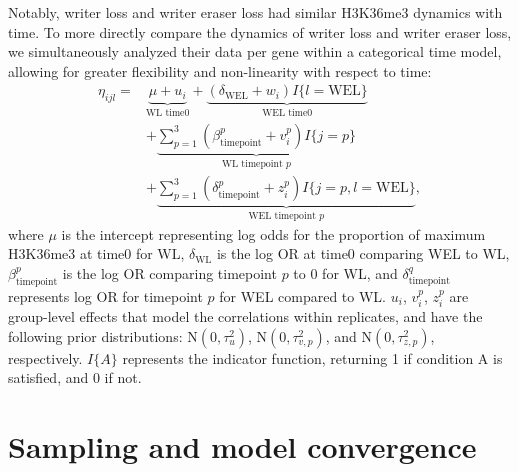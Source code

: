 \documentclass[12pt]{extarticle}
\begin{document}
Notably, writer loss and writer eraser loss had similar H3K36me3 dynamics with time. To more directly compare the dynamics of writer loss and writer eraser loss, we simultaneously analyzed their data per gene within a categorical time model, allowing for greater flexibility and non-linearity with respect to time:
\begin{align}
	\eta_{ijl} = &\underbrace{\mu + u_{i}}_{\text{WL time0}} + \underbrace{(\delta_{\text{WEL}} + w_{i})I\{l = \text{WEL}\}}_{\text{WEL time0}} \\ 
	&+ \underbrace{\sum_{p = 1}^{3}(\beta_{\text{timepoint}}^{p} + v_{i}^{p})I\{j = p\}}_{\text{WL timepoint }p} \nonumber \\ 
	&+ \underbrace{\sum_{p = 1}^{3}(\delta_{\text{timepoint}}^{p} + z_{i}^{p})I\{j = p, l = \text{WEL}\}}_{\text{WEL timepoint }p},\nonumber
\end{align}
where $\mu$ is the intercept representing log odds for the proportion of maximum H3K36me3 at time0 for WL, $\delta_{\text{WL}}$ is the log OR at time0 comparing WEL to WL, $\beta_{\text{timepoint}}^{p}$ is the log OR comparing timepoint $p$ to $0$ for WL, and $\delta_{\text{timepoint}}^{q}$ represents log OR for timepoint $p$ for WEL compared to WL. $u_{i}$, $v_{i}^{p}$, $z_{i}^{p}$ are group-level effects that model the correlations within replicates, and have the following prior distributions: $\text{N}(0, \tau^{2}_{u})$, $\text{N}(0, \tau^{2}_{v,p})$, and $\text{N}(0, \tau^{2}_{z,p})$, respectively. $I\{A\}$ represents the indicator function, returning 1 if condition A is satisfied, and 0 if not.

\section*{Sampling and model convergence}



\end{document}
